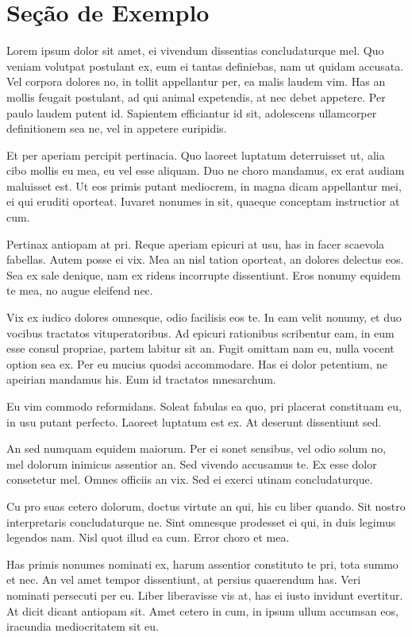 \documentclass[
	12pt,				%
	openright,			%
	oneside,			%
	a4paper,			%
	english,			%
	french,				%
	spanish,			%
	brazil,				%
	]{abntex2}
\begin{document}
\section{Seção de Exemplo}
\label{sec: exemplo}

Lorem ipsum dolor sit amet, ei vivendum dissentias concludaturque mel. Quo veniam volutpat postulant ex, eum ei tantas definiebas, nam ut quidam accusata. Vel corpora dolores no, in tollit appellantur per, ea malis laudem vim. Has an mollis feugait postulant, ad qui animal expetendis, at nec debet appetere. Per paulo laudem putent id. Sapientem efficiantur id sit, adolescens ullamcorper definitionem sea ne, vel in appetere euripidis.

Et per aperiam percipit pertinacia. Quo laoreet luptatum deterruisset ut, alia cibo mollis eu mea, eu vel esse aliquam. Duo ne choro mandamus, ex erat audiam maluisset est. Ut eos primis putant mediocrem, in magna dicam appellantur mei, ei qui eruditi oporteat. Iuvaret nonumes in sit, quaeque conceptam instructior at cum.

Pertinax antiopam at pri. Reque aperiam epicuri at usu, has in facer scaevola fabellas. Autem posse ei vix. Mea an nisl tation oporteat, an dolores delectus eos. Sea ex sale denique, nam ex ridens incorrupte dissentiunt. Eros nonumy equidem te mea, no augue eleifend nec.

Vix ex iudico dolores omnesque, odio facilisis eos te. In eam velit nonumy, et duo vocibus tractatos vituperatoribus. Ad epicuri rationibus scribentur eam, in eum esse consul propriae, partem labitur sit an. Fugit omittam nam eu, nulla vocent option sea ex. Per eu mucius quodsi accommodare. Has ei dolor petentium, ne apeirian mandamus his. Eum id tractatos mnesarchum.

Eu vim commodo reformidans. Soleat fabulas ea quo, pri placerat constituam eu, in usu putant perfecto. Laoreet luptatum est ex. At deserunt dissentiunt sed.

An sed numquam equidem maiorum. Per ei sonet sensibus, vel odio solum no, mel dolorum inimicus assentior an. Sed vivendo accusamus te. Ex esse dolor consetetur mel. Omnes officiis an vix. Sed ei exerci utinam concludaturque.

Cu pro suas cetero dolorum, doctus virtute an qui, his cu liber quando. Sit nostro interpretaris concludaturque ne. Sint omnesque prodesset ei qui, in duis legimus legendos nam. Nisl quot illud ea cum. Error choro et mea.

Has primis nonumes nominati ex, harum assentior constituto te pri, tota summo et nec. An vel amet tempor dissentiunt, at persius quaerendum has. Veri nominati persecuti per eu. Liber liberavisse vis at, has ei iusto invidunt evertitur. At dicit dicant antiopam sit. Amet cetero in cum, in ipsum ullum accumsan eos, iracundia mediocritatem sit eu.
\end{document}
